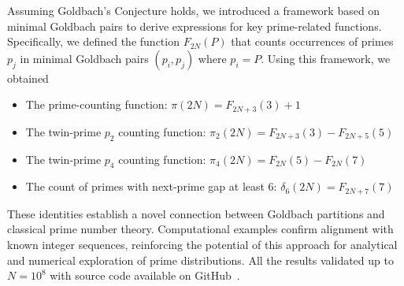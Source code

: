 Assuming Goldbach's Conjecture holds, we introduced a framework based on minimal
Goldbach pairs to derive expressions for key prime-related functions.
Specifically, we defined the function $F_{2N}(P)$ that counts occurrences of primes $p_j$ in minimal Goldbach
pairs $(p_i, p_j)$ where $p_i = P$.
Using this framework, we obtained

\begin{itemize}
    \item The prime-counting function: $\pi(2N) = F_{2N+3}(3) + 1$
    \item The twin-prime $p_2$ counting function: $\pi_2(2N) = F_{2N+3}(3) - F_{2N+5}(5)$
    \item The twin-prime $p_4$ counting function: $\pi_4 (2N) = F_{2N}(5) - F_{2N}(7)$
    \item The count of primes with next-prime gap at least 6: $\delta_6(2N) = F_{2N+7}(7)$
\end{itemize}

These identities establish a novel connection between Goldbach partitions and classical prime number theory.
Computational examples confirm alignment with known integer sequences, reinforcing the potential
of this approach for analytical and numerical exploration of prime distributions.
All the results validated up to $N=10^8$ with source code available on
GitHub~\cite{kolosovpetro2025minimalgoldbachpairs}.

